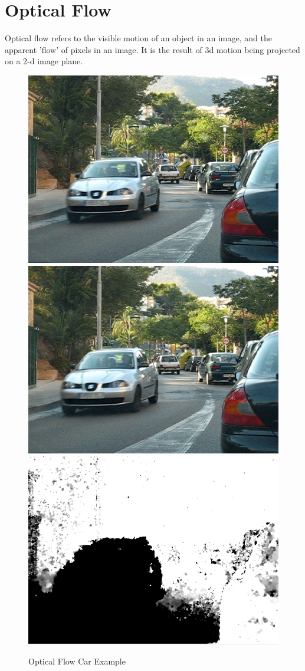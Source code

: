 \section{Optical Flow}
Optical flow refers to the visible motion of an object in an image, and the apparent 'flow' of pixels in an image. It is the result of 3d motion being projected on a 2-d image plane. 
\begin{figure}[htp]
\centering
\includegraphics[width=.3\textwidth]{car1.jpg}\hfill
\includegraphics[width=.3\textwidth]{car2.jpg}\hfill
\includegraphics[width=.3\textwidth]{car_opt_flow.png}
\caption{Optical Flow Car Example}
\end{figure}
